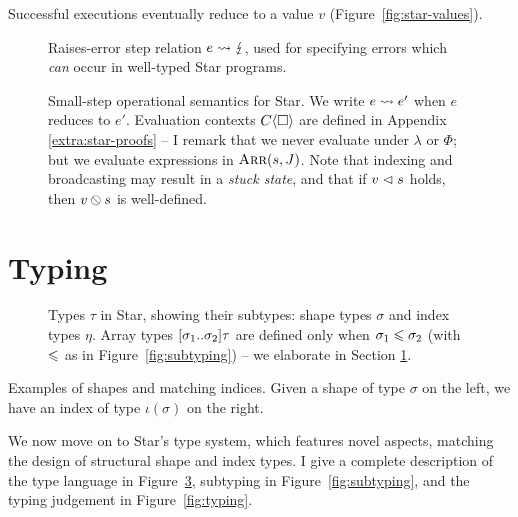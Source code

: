 Successful executions eventually reduce to a value $v$ (Figure~\ref{fig:star-values}). 

\begin{figure}
    \centering
    
    \caption{Raises-error step relation $e \leadsto \lightning$, used for specifying errors which \emph{can} occur in well-typed Star programs.}
    \label{fig:opsem-err}
\end{figure}

\begin{figure}
    \centering
    
    \caption{
        Small-step operational semantics for Star. We write $e \leadsto e'$ when $e$ reduces to $e'$.
        Evaluation contexts $C\langle\Box\rangle$ are defined in Appendix \ref{extra:star-proofs} -- I remark that we never evaluate under $\lambda$ or $\Phi$; but we evaluate expressions in $\textsc{Arr}(s,J)$.
        Note that indexing and broadcasting may result in a \emph{stuck state}, and that if $v \vartriangleleft s$ holds, then ${v} \obslash {s}$ is well-defined.
    }
    \label{fig:opsem}
\end{figure}

\section{Typing}
\label{sec:typing}

\begin{figure}[t]
    \centering
    
    \caption{Types $\tau$ in Star, showing their subtypes: shape types $\sigma$
    and index types $\eta$.
    Array types $\sarraytype{\sigma_1}{\sigma_2}{\tau}$ are defined only when $\sigma_1 \leqslant \sigma_2$ (with $\leqslant$ as in Figure~\ref{fig:subtyping}) -- we elaborate in Section \ref{sec:typing}.
    }
    \label{fig:types}
\end{figure}

\begin{table}[t]
    \centering
    
    \caption{Examples of shapes and matching indices. Given a shape of type $\sigma$ on the left, we have an index of type $\iota(\sigma)$ on the right.}
    \label{tab:shape-index-examples}
\end{table}

We now move on to Star's type system, which features novel aspects, matching the design of structural shape and index types. 
I give a complete description of the type language in Figure~\ref{fig:types}, subtyping in Figure~\ref{fig:subtyping}, and the typing judgement in Figure~\ref{fig:typing}. 


